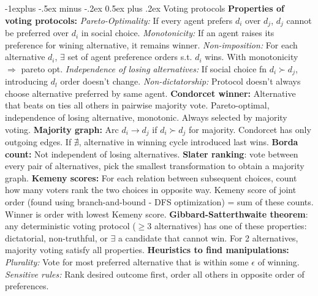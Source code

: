 \documentclass{article}
\makeatletter
\renewcommand{\subsection}{\@startsection{subsection}{2}{0mm}%
                                {-1explus -.5ex minus -.2ex}%
                                {0.5ex plus .2ex}%
                                {\color{blue}\normalfont\scriptsize\bfseries}}
\newcommand{\adv}[1]{{\color{green!60!blue} #1}}
\makeatother
\begin{document}
\begin{multicols*}{4}
\subsection{Voting protocols}
\textbf{Properties of voting protocols: }\textit{Pareto-Optimality: }If every agent prefers $d_i$ over $d_j$, $d_j$ cannot be preferred over $d_i$ in social choice. \textit{Monotonicity: }If an agent raises its preference for wining alternative, it remains winner. \textit{Non-imposition: }For each alternative $d_i$, $\exists$ set of agent preference orders s.t. $d_i$ wins. With monotonicity $\Rightarrow$ pareto opt. \textit{Independence of losing alternatives: }If social choice fn $d_i\succ d_j$, introducing $d_l$ order doesn't change. \textit{Non-dictatorship: }Protocol doesn't always choose alternative preferred by same agent. \textbf{Condorcet winner: }Alternative that beats on ties all others in pairwise majority vote. \adv{Pareto-optimal, independence of losing alternative, monotonic. Always selected by majority voting.} \textbf{Majority graph: }Arc $d_i\to d_j$ if $d_i\succ d_j$ for majority. Condorcet has only outgoing edges. 
If $\nexists$, alternative in winning cycle introduced last wins. \textbf{Borda count: }Not independent of losing alternatives. \textbf{Slater ranking}: vote between every pair of alternatives, pick the smallest transformation to obtain a majority graph. \textbf{Kemeny scores: }For each relation between subsequent choices, count how many voters rank the two choices in opposite way. Kemeny score of joint order (found using branch-and-bound - DFS optimization) = sum of these counts. Winner is order with lowest Kemeny score. \textbf{Gibbard-Satterthwaite theorem}: any deterministic voting protocol ($\geq 3$ alternatives) has one of these properties: dictatorial, non-truthful, or $\exists$ a candidate that cannot win. For 2 alternatives, majority voting satisfy all properties. \textbf{Heuristics to find manipulations: }\textit{Plurality: }Vote for most preferred alternative that is within some $\epsilon$ of winning. \textit{Sensitive rules: }Rank desired outcome first, order all others in opposite order of preferences.

\end{multicols*}
\end{document}
